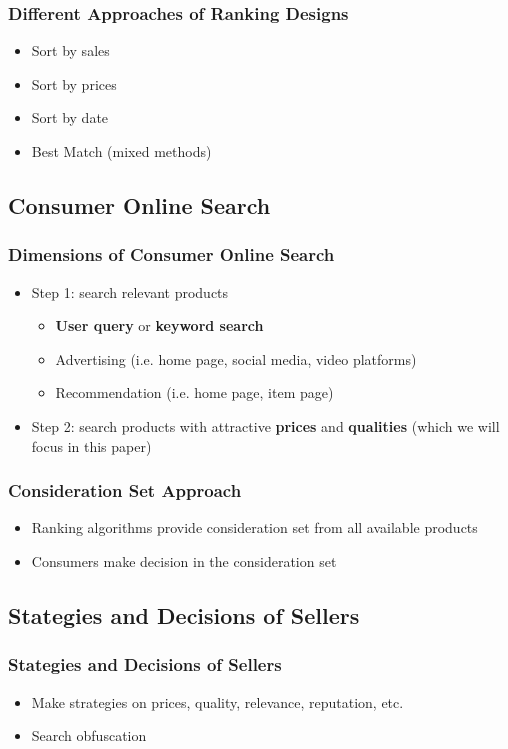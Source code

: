 \documentclass{beamer}
\begin{document}
\begin{frame}
\frametitle{Different Approaches of Ranking Designs}
\begin{itemize}
\item Sort by sales
\item Sort by prices
\item Sort by date
\item Best Match (mixed methods) 
\end{itemize}
\end{frame}

\subsection{Consumer Online Search}
\begin{frame}
\frametitle{Dimensions of Consumer Online Search}
\begin{itemize}
\item Step 1: search relevant products
\begin{itemize}
\item \textbf{User query} or \textbf{keyword search}
\item Advertising (i.e. home page, social media, video platforms)
\item Recommendation (i.e. home page, item page)
\end{itemize}
\item Step 2: search products with attractive \textbf{prices} and \textbf{qualities} (which we will focus in this paper)
\end{itemize}
\end{frame}

\begin{frame}
\frametitle{Consideration Set Approach}
\begin{itemize}
  \item Ranking algorithms provide consideration set from all available products
  \item Consumers make decision in the consideration set
\end{itemize}
\end{frame}

\subsection{Stategies and Decisions of Sellers}
\begin{frame}
\frametitle{Stategies and Decisions of Sellers}
\begin{itemize}
  \item Make strategies on prices, quality, relevance, reputation, etc.
  \item Search obfuscation
\end{itemize}
\end{frame}
\end{document}
